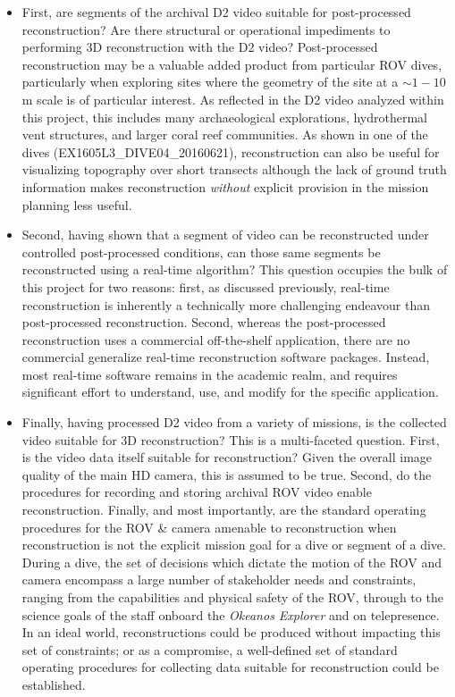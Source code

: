 \documentclass[letterpaper,12pt]{article}
\begin{document}
\begin{itemize}
    \item First, are segments of the archival D2 video suitable for post-processed reconstruction?   Are there structural or operational impediments to performing 3D reconstruction with the D2 video?   Post-processed reconstruction may be a valuable added product from particular ROV dives, particularly when exploring sites where the geometry of the site at a $\sim 1-10$ m scale is of particular interest.  As reflected in the D2 video analyzed within this project, this includes many archaeological explorations,  hydrothermal vent structures, and larger coral reef communities.   As shown in one of the dives (EX1605L3\_DIVE04\_20160621), reconstruction can also be useful for visualizing topography over short transects although the lack of ground truth information makes reconstruction \textit{without} explicit provision in the mission planning less useful.
    
    \item Second, having shown that a segment of video can be reconstructed under controlled post-processed conditions, can those same segments be reconstructed using a real-time algorithm?   This question occupies the bulk of this project for two reasons:  first, as discussed previously, real-time reconstruction is inherently a technically more challenging endeavour than post-processed reconstruction.  Second, whereas the post-processed reconstruction uses a commercial off-the-shelf application, there are no commercial generalize real-time reconstruction software packages.  Instead, most real-time software remains in the academic realm, and requires significant effort to understand, use, and modify for the specific application.  

    \item Finally, having processed D2 video from a variety of missions, is the collected video suitable for 3D reconstruction?  This is a multi-faceted question.  First, is the video data itself suitable for reconstruction?  Given the overall image quality of the main HD camera, this is assumed to be true.  Second, do the procedures for recording and storing archival ROV video enable reconstruction.   Finally, and most importantly, are the standard operating procedures for the ROV \& camera amenable to reconstruction when reconstruction is not the explicit mission goal for a dive or segment of a dive.  During a dive, the set of decisions which dictate the motion of the ROV and camera encompass a large number of stakeholder needs and constraints, ranging from the capabilities and physical safety of the ROV, through to the science goals of the staff onboard the \textit{Okeanos Explorer} and on telepresence.  In an ideal world, reconstructions could be produced without impacting this set of constraints; or as a compromise, a well-defined set of standard operating procedures for collecting data suitable for reconstruction could be established.  
    
\end{itemize}
\end{document}
